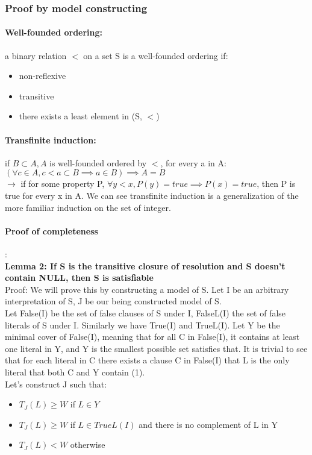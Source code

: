 \documentclass[26pt,fleqn,]{article}
\begin{document}
\subsubsection{Proof by model constructing}
\paragraph{Well-founded ordering:} a binary relation \(<\) on a set S is a well-founded ordering if:
\begin{itemize}
	\item non-reflexive
	\item transitive
	\item there exists a least element in (S, \(<\))
\end{itemize}
\paragraph{Transfinite induction:} if \(B \subset A, A\) is well-founded ordered by \(<\), for every a in A:\\
\(({\forall c \in A, c < a} \subset B \implies a \in B) \implies A = B\)\\
\(\to\) if for some property P, \(\forall y < x, P(y) = true \implies P(x) = true\), then P is true for 
every x in A.
We can see transfinite induction is a generalization of the more familiar induction on the set of integer.\\
\paragraph{Proof of completeness}:\\
{\bfseries Lemma 2: If S is the transitive closure of resolution and S doesn't contain NULL, then S is
satisfiable\\}
Proof: We will prove this by constructing a model of S. Let I be an arbitrary interpretation of S, J be
our being constructed model of S.\\
Let False(I) be the set of false clauses of S under I, FalseL(I) the set of false literals of S under I.
Similarly we have True(I) and TrueL(I).
Let Y be the minimal cover of False(I), meaning that for all C in False(I), it contains at least one 
literal in Y, and Y is the smallest possible set satisfies that. It is trivial to see that for each 
literal in C there exists a clause C in False(I) that L is the only literal that both C and Y contain
(1).\\

Let's construct J such that:
\begin{itemize}
	\item \(T_J(L) \ge W \) if \(L \in Y\)
	\item \(T_J(L) \ge W \) if \(L \in TrueL(I)\) and there is no complement of L in Y
	\item \(T_J(L) < W\) otherwise
\end{itemize}
\end{document}
